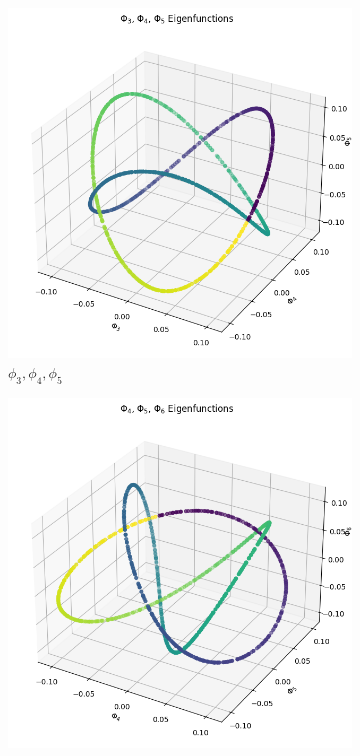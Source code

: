 \begin{figure}[H]
    \begin{subfigure}{.28\textwidth}
        \includegraphics[width=\linewidth]{images/ex3_task2_part3_3D_4.png}
        \caption{$\phi_3, \phi_4, \phi_5$ }
    \end{subfigure}%
    \begin{subfigure}{.28\textwidth}
        \includegraphics[width=\linewidth]{images/ex3_task2_part3_3D_5.png}

\end{subfigure}
\end{figure}

